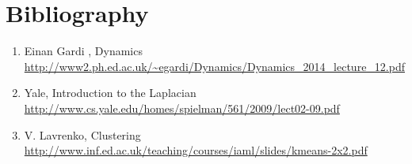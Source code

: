 \documentclass[10pt,twocolumn]{article}
\begin{document}
\section{Bibliography}
\begin{enumerate}
\item Einan Gardi , Dynamics \url{http://www2.ph.ed.ac.uk/~egardi/Dynamics/Dynamics_2014_lecture_12.pdf}
\item  Yale, Introduction to the Laplacian \url{http://www.cs.yale.edu/homes/spielman/561/2009/lect02-09.pdf}
\item V. Lavrenko, Clustering \url{http://www.inf.ed.ac.uk/teaching/courses/iaml/slides/kmeans-2x2.pdf}
\end{enumerate}
\end{document}
